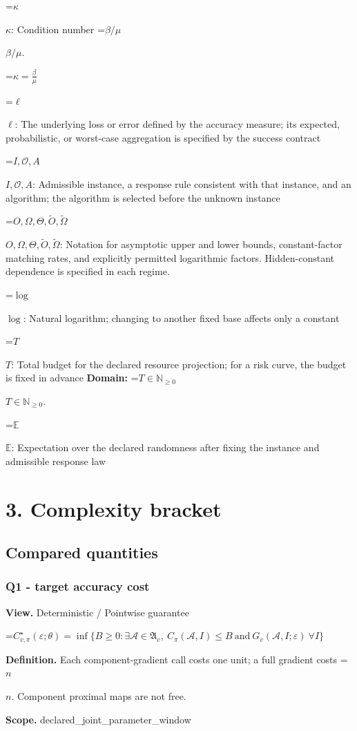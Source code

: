 \documentclass[10pt,a4paper]{article}
\newcommand{\AtlasMath}[1]{\par\begingroup\centering\setbox0=\hbox{$\displaystyle #1$}\ifdim\wd0>1.4\linewidth\typeout{ATLAS WIDE FORMULA: \the\wd0}\fi\ifdim\wd0>\linewidth\resizebox{\linewidth}{!}{\box0}\else\box0\fi\par\endgroup}
\newcommand{\AtlasInlineMath}[1]{\begingroup\setbox0=\hbox{$#1$}\ifdim\wd0>.4\linewidth\endgroup\AtlasMath{#1}\else\endgroup$#1$\fi}
\begin{document}
\AtlasInlineMath{\kappa}: Condition number \AtlasInlineMath{\beta/\mu}.


\AtlasMath{\kappa=\frac{\beta}{\mu}}


\AtlasInlineMath{\ell}: The underlying loss or error defined by the accuracy measure; its expected, probabilistic, or worst-case aggregation is specified by the success contract

\AtlasInlineMath{I,\mathcal{O},A}: Admissible instance, a response rule consistent with that instance, and an algorithm; the algorithm is selected before the unknown instance

\AtlasInlineMath{O,\Omega,\Theta,\widetilde{O},\widetilde\Omega}: Notation for asymptotic upper and lower bounds, constant-factor matching rates, and explicitly permitted logarithmic factors. Hidden-constant dependence is specified in each regime.

\AtlasInlineMath{\log}: Natural logarithm; changing to another fixed base affects only a constant

\AtlasInlineMath{T}: Total budget for the declared resource projection; for a risk curve, the budget is fixed in advance \textbf{Domain:} \AtlasInlineMath{T\in\mathbb{N}_{\ge0}}.

\AtlasInlineMath{\mathbb{E}}: Expectation over the declared randomness after fixing the instance and admissible response law

\section{3. Complexity bracket}
\subsection{Compared quantities}
\subsubsection{Q1 - target accuracy cost}
\textbf{View.} Deterministic / Pointwise guarantee

\AtlasMath{C^\star_{v,\pi}(\varepsilon;\theta)=\inf\{B\ge0:\exists\mathcal A\in\mathfrak A_v,\ C_\pi(\mathcal A,I)\le B\ \text{and}\ G_v(\mathcal A,I;\varepsilon)\ \forall I\}}
\textbf{Definition.} Each component-gradient call costs one unit; a full gradient costs \AtlasInlineMath{n}. Component proximal maps are not free.

\textbf{Scope.} declared\_joint\_parameter\_window
\end{document}

